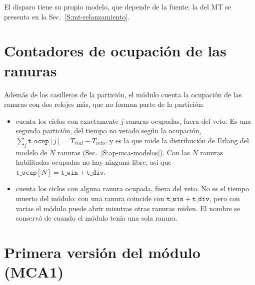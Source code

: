 El disparo tiene su propio modelo, que depende de la fuente: la del MT se
presenta en la Sec.~\ref{S:mt-relanzamiento}.

\section{Contadores de ocupación de las ranuras}
\label{S:ap-mca-ocupacion}

Además de los casilleros de la partición, el módulo cuenta la ocupación de las
ranuras con dos relojes más, que no forman parte de la partición:
\begin{itemize}
  \item {} cuenta los ciclos con exactamente $j$ ranuras
    ocupadas, fuera del veto. Es una segunda partición, del tiempo no vetado según
    la ocupación, $\sum_j \mathtt{t\_ocup}[j] = T_{real} - T_{veto}$, y es la que
    mide la distribución de Erlang del modelo de $N$ ranuras
    (Sec.~\ref{S:ap-mca-modelos}). Con las $N$ ranuras habilitadas ocupadas no
    hay ninguna libre, así que $\mathtt{t\_ocup}[N] = \mathtt{t\_win} +
    \mathtt{t\_div}$.
  \item {} cuenta los ciclos con alguna ranura ocupada, fuera del
    veto. No es el tiempo muerto del módulo: con una ranura coincide con
    $\mathtt{t\_win} + \mathtt{t\_div}$, pero con varias el módulo puede abrir
    mientras otras ranuras miden. El nombre se conservó de cuando el módulo
    tenía una sola ranura.
\end{itemize}

\section{Primera versión del módulo (MCA1)}
\label{S:ap-mca-mca1}

